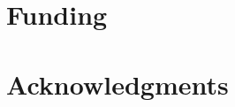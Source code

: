 \documentclass[manuscript,screen,review]{acmart}
\begin{document}
\section*{Funding}

\section*{Acknowledgments}




\end{document}
